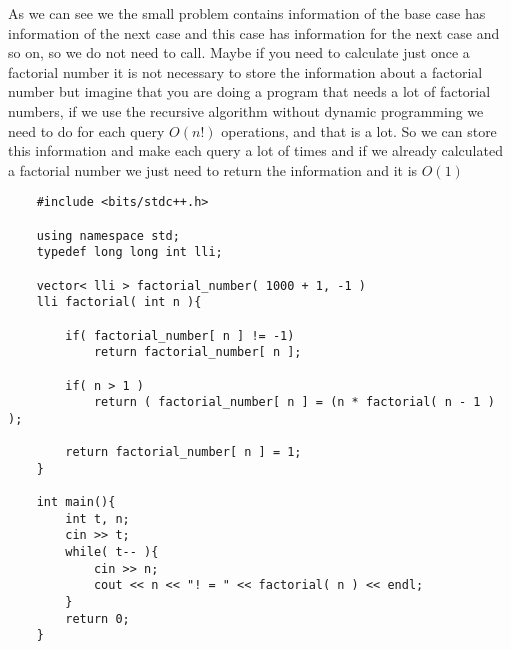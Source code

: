 \begin{figure}[H]
\begin{center}
\end{center}
\end{figure}

As we can see we the small problem contains information of the base case has information of the next case and this case has information for the next case and so on, so we do not need to call. Maybe if you need to calculate just once a factorial number it is not necessary to store the information about a factorial number but imagine that you are doing a program that needs a lot of factorial numbers, if we use the recursive algorithm without dynamic programming we need to do for each query $O(n!)$ operations, and that is a lot. So we can store this information and make each query a lot of times and if we already calculated a factorial number we just need to return the information and it is $O(1)$

\begin{lstlisting}
    #include <bits/stdc++.h>

    using namespace std;
    typedef long long int lli;

    vector< lli > factorial_number( 1000 + 1, -1 )
    lli factorial( int n ){

        if( factorial_number[ n ] != -1)
            return factorial_number[ n ];

        if( n > 1 )
            return ( factorial_number[ n ] = (n * factorial( n - 1 ) );

        return factorial_number[ n ] = 1;
    }

    int main(){
        int t, n;
        cin >> t;
        while( t-- ){
            cin >> n;
            cout << n << "! = " << factorial( n ) << endl;
        }
        return 0;  
    }
\end{lstlisting}

